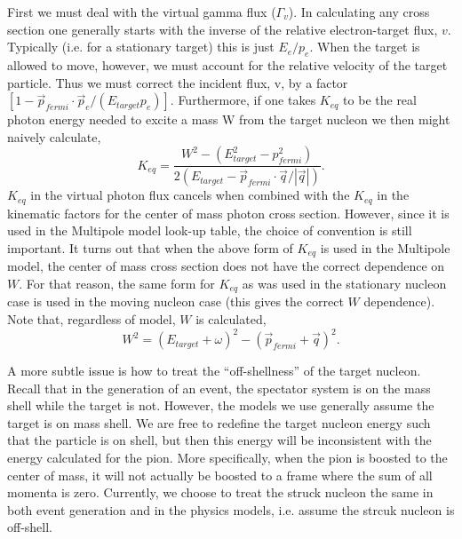 First we must deal with the virtual gamma flux ($\Gamma_v$). In calculating
any cross section one generally starts with the inverse of the relative 
electron-target flux, $v$.  Typically
(i.e. for a stationary target) this is just $E_e/p_e$.  When the target is
allowed to move, however, we must account for the relative velocity of the 
target particle.  Thus we must correct the incident flux, v, by a factor
$[1 - \vec{p}_{fermi}\cdot\vec{p}_e/(E_{target}p_e)]$. 
Furthermore, if one takes $K_{eq}$ to be the real photon energy needed to 
excite a mass W from the target nucleon we then might naively calculate,
$$
K_{eq} = \frac{W^2 - (E_{target}^2-p_{fermi}^2)}{2(E_{target}-
\vec{p}_{fermi}  \cdot \vec{q}/|\vec{q}|)}.
$$
$K_{eq}$ in the virtual photon flux cancels when combined with the $K_{eq}$ 
in the kinematic factors for the center of mass photon cross section.  
However, since it is
used in the Multipole model look-up table, the choice of convention is still
important.  It turns out that when the above form of $K_{eq}$ is used in the 
Multipole model, the center of mass cross section does not have the correct 
dependence on $W$.  For that reason, the same form for $K_{eq}$ as was used
in the stationary nucleon case is used in the moving nucleon case (this gives
the correct $W$ dependence).  Note that, regardless of model, $W$ is 
calculated,
$$
W^2 = (E_{target}+\omega)^2 - (\vec{p}_{fermi}+\vec{q})^2.
$$

A more subtle issue is how to treat the ``off-shellness'' of the target 
nucleon.  Recall that in the generation of an event, the spectator system is 
on the mass shell while
the target is not.  However, the models we use generally assume the target is
on mass shell.  We are free to redefine the target nucleon energy such that
the particle is on shell, but then this energy will be inconsistent with
the energy calculated for the pion.  More specifically, when the pion is 
boosted to the center of mass, it will not actually be boosted to a frame 
where the sum of all momenta is zero.  Currently, we choose to treat the 
struck nucleon the same in both event generation and in the physics models, 
i.e. assume the strcuk nucleon is off-shell.

